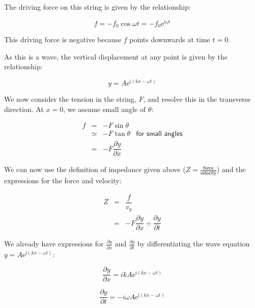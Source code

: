 \documentclass[
]{book}
\begin{document}
The driving force on this string is given by the relationship:

\begin{equation}
f = -f_0 \cos \omega t = -f_0 \mathrm{e}^{\mathrm{i}\omega t}
\end{equation}

This driving force is negative because \(f\) points downwards at time \(t = 0\).

As this is a wave, the vertical displacement at any point is given by the relationship:

\begin{equation}
y = A \mathrm{e}^{\mathrm{i}(kx - \omega t)}
\end{equation}

We now consider the tension in the string, \(F\), and resolve this in the transverse direction. At \(x = 0\), we assume small angle of \(\theta\):

\begin{equation}
\begin{array}{rcll}
f &=& -F\sin \theta \\
  &\simeq &  -F \tan \theta & \textsf{for small angles}\\
  &=& -F \dfrac{\partial y}{\partial x}
\end{array}
\end{equation}

We can now use the definition of impedance given above (\(Z = \frac{\textsf{force}}{\textsf{velocity}}\)) and the expressions for the force and velocity:

\begin{equation}
\begin{array}{rcl}
Z &=& \dfrac{f}{v_y} \\
 &=& -F\dfrac{\partial y}{\partial x} \div \dfrac{\partial y}{\partial t}
\end{array}
\end{equation}

We already have expressions for \(\frac{\partial y}{\partial x}\) and \(\frac{\partial y}{\partial t}\) by differentiating the wave equation \(y = A \mathrm{e}^{\mathrm{i}(kx - \omega t)}\):

\begin{equation}
\frac{\partial y}{\partial x} = ik A \mathrm{e}^{\mathrm{i}(kx - \omega t)}
\end{equation}

\begin{equation}
\frac{\partial y}{\partial t} = -i \omega A \mathrm{e}^{\mathrm{i}(kx - \omega t)}
\end{equation}
\end{document}
